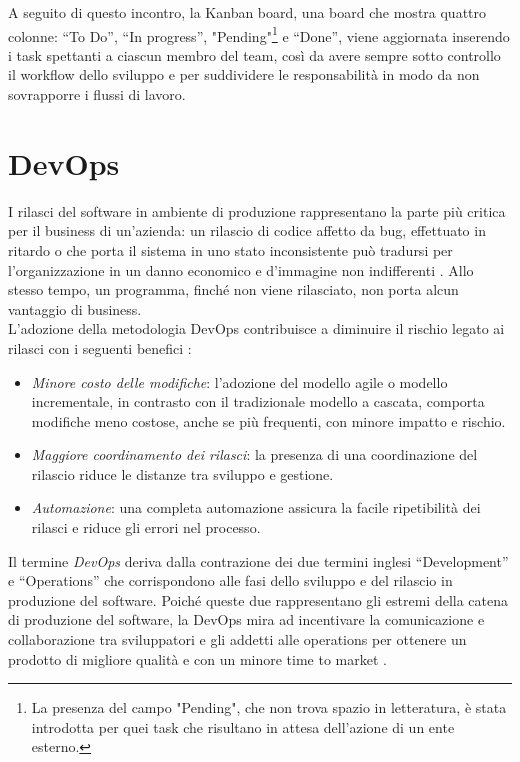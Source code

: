 \documentclass[a4paper, 12pt]{report}
\numberwithin{equation}{section}
\begin{document}
A seguito di questo incontro, la Kanban board, una board che mostra quattro colonne: “To Do”, “In progress”, "Pending"\footnote{La presenza del campo "Pending", che non trova spazio in letteratura, è stata introdotta per quei task che risultano in attesa dell'azione di un ente esterno.} e “Done”, viene aggiornata inserendo i task spettanti a ciascun membro del team, così da avere sempre sotto controllo il workflow dello sviluppo e per suddividere le responsabilità in modo da non sovrapporre i flussi di lavoro.\\


\section{DevOps}\label{devops}
I rilasci del software in ambiente di produzione rappresentano la parte più critica per il business di un’azienda: un rilascio di codice affetto da bug, effettuato in ritardo o che porta il sistema in uno stato inconsistente può tradursi per l’organizzazione in un danno economico e d’immagine non indifferenti \cite{garfinkel-agile}. Allo stesso tempo, un programma, finché non viene rilasciato, non porta alcun vantaggio di business.\\
L’adozione della metodologia DevOps contribuisce a diminuire il rischio legato ai rilasci con i seguenti benefici \cite{wikipedia-devops-agile}:
\begin{itemize}
    \item \emph{Minore costo delle modifiche}: l'adozione del modello agile o modello incrementale, in contrasto con il tradizionale modello a cascata, comporta modifiche meno costose, anche se più frequenti, con minore impatto e rischio.
    \item \emph{Maggiore coordinamento dei rilasci}: la presenza di una coordinazione del rilascio riduce le distanze tra sviluppo e gestione.
    \item \emph{Automazione}: una completa automazione assicura la facile ripetibilità dei rilasci e riduce gli errori nel processo.
\end{itemize}
Il termine \emph{DevOps} deriva dalla contrazione dei due termini inglesi “Development” e “Operations” che corrispondono alle fasi dello sviluppo e del rilascio in produzione del software. Poiché queste due rappresentano gli estremi della catena di produzione del software, la DevOps mira ad incentivare la comunicazione e collaborazione tra sviluppatori e gli addetti alle operations per ottenere un prodotto di migliore qualità e con un minore time to market \cite{hutterman-iac}.\\
\end{document}
